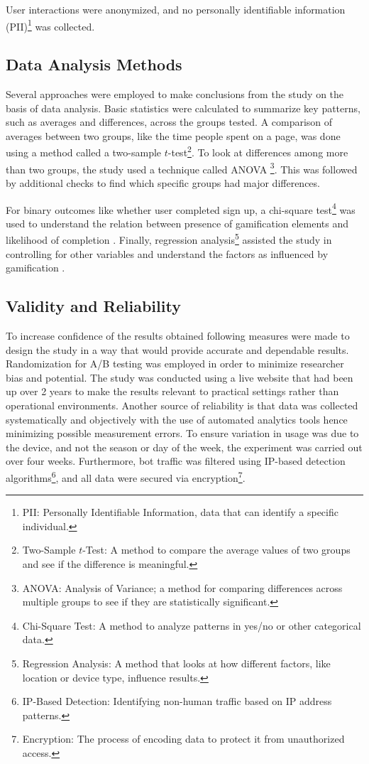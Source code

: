 \documentclass[conference]{IEEEtran}
\begin{document}
User interactions were anonymized, and no personally identifiable information (PII)\footnote{PII: Personally Identifiable Information, data that can identify a specific individual.} was collected.

\subsection{Data Analysis Methods}

Several approaches were employed to make conclusions from the study on the basis of data analysis. Basic statistics were calculated to summarize key patterns, such as averages and differences, across the groups tested. A comparison of averages between two groups, like the time people spent on a page, was done using a method called a two-sample \( t \)-test\footnote{Two-Sample \( t \)-Test: A method to compare the average values of two groups and see if the difference is meaningful.}\cite{statology_ttest_anova}. To look at differences among more than two groups, the study used a technique called ANOVA \footnote{ANOVA: Analysis of Variance; a method for comparing differences across multiple groups to see if they are statistically significant.}\cite{statology_chisquare_anova}. This was followed by additional checks to find which specific groups had major differences.

For binary outcomes like whether user completed sign up, a chi-square test\footnote{Chi-Square Test: A method to analyze patterns in yes/no or other categorical data.} was used to understand the relation between presence of gamification elements and likelihood of completion \cite{builtin_ttest_chisquare}. Finally, regression analysis\footnote{Regression Analysis: A method that looks at how different factors, like location or device type, influence results.} assisted the study in controlling for other variables and understand the factors as influenced by gamification \cite{psu_regression}.

\subsection{Validity and Reliability}

To increase confidence of the results obtained following measures were made to design the study in a way that would provide accurate and dependable results. Randomization for A/B testing was employed in order to minimize researcher bias and potential. The study was conducted using a live website that had been up over 2 years to make the results relevant to practical settings rather than operational environments. Another source of reliability is that data was collected systematically and objectively with the use of automated analytics tools hence minimizing possible measurement errors. To ensure variation in usage was due to the device, and not the season or day of the week, the experiment was carried out over four weeks. Furthermore, bot traffic was filtered using IP-based detection algorithms\footnote{IP-Based Detection: Identifying non-human traffic based on IP address patterns.}, and all data were secured via encryption\footnote{Encryption: The process of encoding data to protect it from unauthorized access.}.
\end{document}
